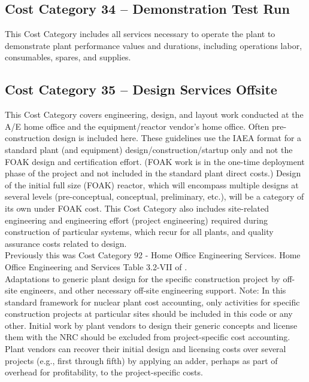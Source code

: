 \subsection*{Cost Category 34 – Demonstration Test Run}
This Cost Category includes all services necessary to operate the plant to demonstrate plant performance values and durations, including operations labor, consumables, spares, and supplies.

\subsection*{Cost Category 35 – Design Services Offsite}
This Cost Category covers engineering, design, and layout work conducted at the A/E home office and the equipment/reactor vendor’s home office. Often pre-construction design is included here. These guidelines use the IAEA format for a standard plant (and equipment) design/construction/startup only and not the FOAK design and certification effort. (FOAK work is in the one-time deployment phase of the project and not included in the standard plant direct costs.) Design of the initial full size (FOAK) reactor, which will encompass multiple designs at several levels (pre-conceptual, conceptual, preliminary, etc.), will be a category of its own under FOAK cost. This Cost Category also includes site-related engineering and engineering effort (project engineering) required during construction of particular systems, which recur for all plants, and quality assurance costs related to design.\\

Previously this was Cost Category 92 - Home Office Engineering Services.  Home Office Engineering and Services  Table 3.2-VII of \cite{SCH78}.\\

Adaptations to generic plant design for the specific construction project by off-site engineers, and other necessary off-site engineering support. Note: In this standard framework for nuclear plant cost accounting, only activities for specific construction projects at particular sites should be included in this code or any other. Initial work by plant vendors to design their generic concepts and license them with the NRC should be excluded from project-specific cost accounting. Plant vendors can recover their initial design and licensing costs over several projects (e.g., first through fifth) by applying an adder, perhaps as part of overhead for profitability, to the project-specific costs.\\


